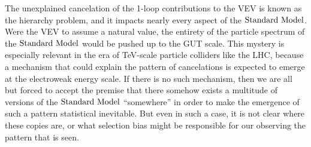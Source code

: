 The unexplained cancelation of the 1-loop contributions to the VEV is known as the hierarchy problem, and it impacts nearly every aspect of the $\text{Standard\ Model}$. Were the VEV to assume a natural value, the entirety of the particle spectrum of the $\text{Standard\ Model}$ would be pushed up to the GUT scale. This mystery is especially relevant in the era of TeV-scale particle colliders like the LHC, because a mechanism that could explain the pattern of cancelations is expected to emerge at the electroweak energy scale.  If there is no such mechanism, then we are all but forced to accept the premise that there somehow exists a multitude of versions of the $\text{Standard\ Model}$ ``somewhere'' in order to make the emergence of such a pattern statistical inevitable. But even in such a case, it is not clear where these copies are, or what selection bias might be responsible for our observing the pattern that is seen. 
